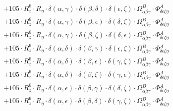 \documentclass{article}
\begin{document}
\begin{equation}
\begin{array}{c}
 \\[0.2em] 		 + 105 \cdot R_{z}^{6} \cdot R_{\eta{}} \cdot \delta{}\left(\alpha{}, \gamma{}\right) \cdot \delta{}\left(\beta{}, \delta{}\right) \cdot \delta{}\left(\epsilon{}, \zeta{}\right) \cdot \Omega{}^{B}_{\alpha{}\beta{}\gamma{}} \cdot \Phi{}^{A}_{\delta{}\epsilon{}\zeta{}\eta{}} 
 \\[0.2em] 		 + 105 \cdot R_{z}^{6} \cdot R_{\eta{}} \cdot \delta{}\left(\alpha{}, \gamma{}\right) \cdot \delta{}\left(\beta{}, \epsilon{}\right) \cdot \delta{}\left(\delta{}, \zeta{}\right) \cdot \Omega{}^{B}_{\alpha{}\beta{}\gamma{}} \cdot \Phi{}^{A}_{\delta{}\epsilon{}\zeta{}\eta{}} 
 \\[0.2em] 		 + 105 \cdot R_{z}^{6} \cdot R_{\eta{}} \cdot \delta{}\left(\alpha{}, \gamma{}\right) \cdot \delta{}\left(\beta{}, \zeta{}\right) \cdot \delta{}\left(\delta{}, \epsilon{}\right) \cdot \Omega{}^{B}_{\alpha{}\beta{}\gamma{}} \cdot \Phi{}^{A}_{\delta{}\epsilon{}\zeta{}\eta{}} 
 \\[0.2em] 		 + 105 \cdot R_{z}^{6} \cdot R_{\eta{}} \cdot \delta{}\left(\alpha{}, \delta{}\right) \cdot \delta{}\left(\beta{}, \gamma{}\right) \cdot \delta{}\left(\epsilon{}, \zeta{}\right) \cdot \Omega{}^{B}_{\alpha{}\beta{}\gamma{}} \cdot \Phi{}^{A}_{\delta{}\epsilon{}\zeta{}\eta{}} 
 \\[0.2em] 		 + 105 \cdot R_{z}^{6} \cdot R_{\eta{}} \cdot \delta{}\left(\alpha{}, \delta{}\right) \cdot \delta{}\left(\beta{}, \epsilon{}\right) \cdot \delta{}\left(\gamma{}, \zeta{}\right) \cdot \Omega{}^{B}_{\alpha{}\beta{}\gamma{}} \cdot \Phi{}^{A}_{\delta{}\epsilon{}\zeta{}\eta{}} 
 \\[0.2em] 		 + 105 \cdot R_{z}^{6} \cdot R_{\eta{}} \cdot \delta{}\left(\alpha{}, \delta{}\right) \cdot \delta{}\left(\beta{}, \zeta{}\right) \cdot \delta{}\left(\gamma{}, \epsilon{}\right) \cdot \Omega{}^{B}_{\alpha{}\beta{}\gamma{}} \cdot \Phi{}^{A}_{\delta{}\epsilon{}\zeta{}\eta{}} 
 \\[0.2em] 		 + 105 \cdot R_{z}^{6} \cdot R_{\eta{}} \cdot \delta{}\left(\alpha{}, \epsilon{}\right) \cdot \delta{}\left(\beta{}, \gamma{}\right) \cdot \delta{}\left(\delta{}, \zeta{}\right) \cdot \Omega{}^{B}_{\alpha{}\beta{}\gamma{}} \cdot \Phi{}^{A}_{\delta{}\epsilon{}\zeta{}\eta{}} 
 \\[0.2em] 		 + 105 \cdot R_{z}^{6} \cdot R_{\eta{}} \cdot \delta{}\left(\alpha{}, \epsilon{}\right) \cdot \delta{}\left(\beta{}, \delta{}\right) \cdot \delta{}\left(\gamma{}, \zeta{}\right) \cdot \Omega{}^{B}_{\alpha{}\beta{}\gamma{}} \cdot \Phi{}^{A}_{\delta{}\epsilon{}\zeta{}\eta{}} 

\end{array}
\end{equation}
\end{document}
